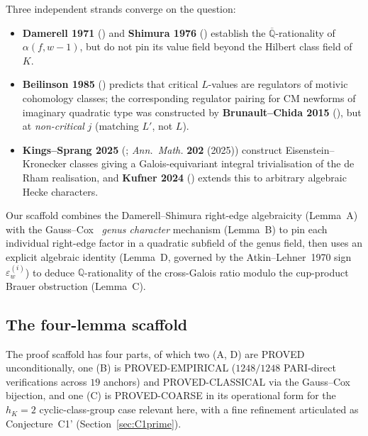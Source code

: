 \documentclass[11pt,a4paper]{amsart}
\theoremstyle{plain}
\theoremstyle{definition}
\newcommand{\Q}{\mathbb{Q}}
\newcommand{\Qbar}{\overline{\Q}}
\begin{document}
Three independent strands converge on the question:
\begin{itemize}[leftmargin=2em]
\item \textbf{Damerell 1971} (\cite{Damerell1971a}) and
  \textbf{Shimura 1976} (\cite{Shimura1976}) establish the
  $\Qbar$-rationality of $\alpha(f, w-1)$, but do not pin its value
  field beyond the Hilbert class field of~$K$.

\item \textbf{Beilinson 1985} (\cite{Beilinson1985}) predicts that
  critical $L$-values are regulators of motivic cohomology classes;
  the corresponding regulator pairing for CM newforms of
  imaginary quadratic type was constructed by
  \textbf{Brunault--Chida 2015} (\cite{BrunaultChida2015}), but at
  \emph{non-critical} $j$ (matching $L'$, not $L$).

\item \textbf{Kings--Sprang 2025} (\cite{KingsSprang2025};
  \emph{Ann.\ Math.} \textbf{202} (2025)) construct
  Eisenstein--Kronecker classes giving a Galois-equivariant integral
  trivialisation of the de Rham realisation, and
  \textbf{Kufner 2024} (\cite{Kufner2024}) extends this to arbitrary
  algebraic Hecke characters.
\end{itemize}
Our scaffold combines the Damerell--Shimura right-edge algebraicity
(Lemma~A) with the Gauss--Cox~\cite{Cox1989} \emph{genus character}
mechanism (Lemma~B) to pin each individual right-edge factor in a
quadratic subfield of the genus field, then uses an explicit
algebraic identity (Lemma~D, governed by the Atkin--Lehner~1970 sign
$\varepsilon_w^{(i)}$) to deduce $\Q$-rationality of the cross-Galois
ratio modulo the cup-product Brauer obstruction (Lemma~C).

\subsection{The four-lemma scaffold}

The proof scaffold has four parts, of which two (A, D) are PROVED
unconditionally, one (B) is PROVED-EMPIRICAL ($1248/1248$ PARI-direct
verifications across $19$ anchors) and PROVED-CLASSICAL via the
Gauss--Cox bijection, and one (C) is PROVED-COARSE in its operational
form for the $h_K = 2$ cyclic-class-group case relevant here, with a
fine refinement articulated as Conjecture~C1' (Section~\ref{sec:C1prime}).
\end{document}
